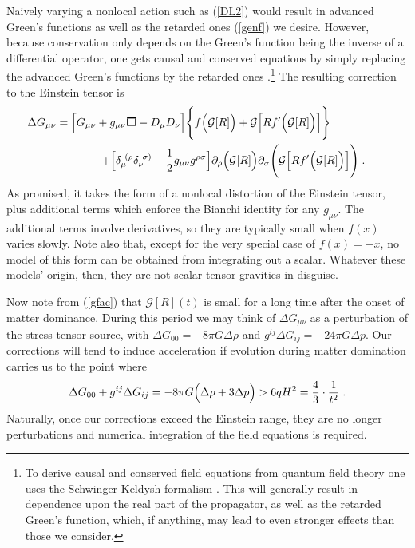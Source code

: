 \documentclass[12pt]{article}
\def\square{\kern1pt\vbox{\hrule height 1.2pt\hbox{\vrule width 1.2pt\hskip 3pt
   \vbox{\vskip 6pt}\hskip 3pt\vrule width 0.6pt}\hrule height 0.6pt}\kern1pt}
\begin{document}
Naively varying a nonlocal action such as (\ref{DL2}) would result in
advanced Green's functions as well as the retarded ones (\ref{genf})
we desire. However, because conservation only depends on the Green's
function being the inverse of a differential operator, one gets causal
and conserved equations by simply replacing the advanced Green's
functions by the retarded ones \cite{SW}.\footnote{To derive causal and
conserved field equations from quantum field theory one uses the
Schwinger-Keldysh formalism \cite{RJ}. This will generally result in
dependence upon the real part of the propagator, as well as the retarded
Green's function, which, if anything, may lead to even stronger effects than
those we consider.} The resulting correction to the Einstein tensor is
\begin{eqnarray}
\lefteqn{\Delta G_{\mu\nu} = \Bigl[ G_{\mu\nu} +
g_{\mu\nu} \square - D_{\mu} D_{\nu} \Bigr] \Biggl\{ f\Bigl(\mathcal{G}[R]
\Bigr) + \mathcal{G}\Bigl[ R f'\Bigl(\mathcal{G}[R]\Bigr)\Bigr]
\Biggl\} } \nonumber \\
& & \hspace{2cm} + \Bigl[\delta_{\mu}^{~(\rho} \delta_{\nu}^{~\sigma)} -
\frac12 g_{\mu\nu} g^{\rho\sigma}\Bigr] \partial_{\rho} \Bigl(\mathcal{G}[R]
\Bigr) \partial_{\sigma} \Biggl(\mathcal{G}\Bigl[ R
f'\Bigl(\mathcal{G}[R] \Bigr) \Bigr] \Biggr) \; . \qquad \label{mod2}
\end{eqnarray}
As promised, it takes the form of a nonlocal distortion of the Einstein
tensor, plus additional terms which enforce the Bianchi identity for any
$g_{\mu\nu}$. The additional terms involve derivatives, so they are
typically small when $f(x)$ varies slowly. Note also that, except for the 
very special case of $f(x)=-x$, no model of this form can be obtained from 
integrating out a scalar. Whatever these models' origin, then, they are not 
scalar-tensor gravities in disguise.

Now note from (\ref{gfac}) that $\mathcal{G}[R](t)$ is small for a long
time after the onset of matter dominance. During this period we may think of
$\Delta G_ {\mu\nu}$ as a perturbation of the stress tensor source, with
$\Delta G_ {00} = -8\pi G \Delta \rho$ and $g^{ij} \Delta G_{ij} = -24 \pi
G \Delta p$. Our corrections will tend to induce acceleration if evolution
during matter domination carries us to the point where
\begin{equation}
\Delta G_{00} + g^{ij} \Delta G_{ij} = -8 \pi G \Bigl(\Delta \rho + 3
\Delta p\Bigr) > 6 q H^2 = \frac43 \cdot \frac1{t^2} \; . \label{Etrace}
\end{equation}
Naturally, once our corrections exceed the Einstein range, they are no longer
perturbations and numerical integration of the field equations is required.
\end{document}
